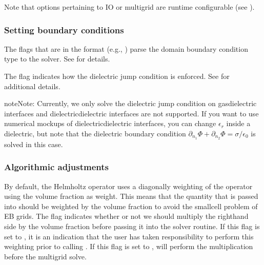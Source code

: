 \documentclass[letterpaper,10pt,english]{sphinxmanual}
\begin{document}
\sphinxAtStartPar
Note that  options pertaining to IO or multigrid are run\sphinxhyphen{}time configurable (see {\hyperref[\detokenize{Base/Control:chap-runtimeconfig}]{}}).


\subsubsection{Setting boundary conditions}
\label{\detokenize{Solvers/Electrostatics:setting-boundary-conditions}}
\sphinxAtStartPar
The flags that are in the format  (e.g., ) parse the domain boundary condition type to the solver.
See {\hyperref[\detokenize{Solvers/Electrostatics:chap-poissondomainbc}]{}} for details.

\sphinxAtStartPar
The flag  indicates how the dielectric jump condition is enforced.
See {\hyperref[\detokenize{Solvers/Electrostatics:chap-poissondielectricbc}]{}} for additional details.

\begin{sphinxadmonition}{note}{Note:}
\sphinxAtStartPar
Currently, we only solve the dielectric jump condition on gas\sphinxhyphen{}dielectric interfaces and dielectric\sphinxhyphen{}dielectric interfaces are not supported.
If you want to use numerical mock\sphinxhyphen{}ups of dielectric\sphinxhyphen{}dielectric interfaces, you can change \(\epsilon_r\) inside a dielectric, but note that the dielectric boundary condition \(\partial_{n_1}\Phi + \partial_{n_2}\Phi = \sigma/\epsilon_0\) is  solved in this case.
\end{sphinxadmonition}


\subsubsection{Algorithmic adjustments}
\label{\detokenize{Solvers/Electrostatics:algorithmic-adjustments}}
\sphinxAtStartPar
By default, the Helmholtz operator uses a diagonally weighting of the operator using the volume fraction as weight.
This means that the quantity that is passed into  should be weighted by the volume fraction to avoid the small\sphinxhyphen{}cell problem of EB grids.
The flag  indicates whether or not we should multiply the right\sphinxhyphen{}hand side by the volume fraction before passing it into the solver routine.
If this flag is set to , it is an indication that the user has taken responsibility to perform this weighting prior to calling .
If this flag is set to ,  will perform the multiplication before the multigrid solve.
\end{document}
